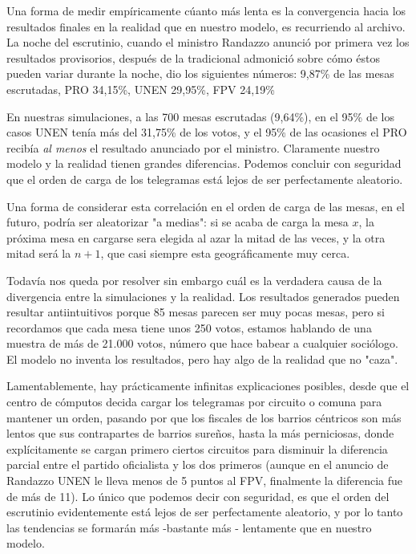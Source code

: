 \documentclass[12pt, a4paper]{article}
\begin{document}
Una forma de medir emp\'iricamente c\'uanto m\'as lenta es la convergencia hacia los resultados finales en la realidad que en nuestro modelo, es recurriendo al archivo. La noche del escrutinio, cuando el ministro Randazzo anunci\'o por primera vez los resultados provisorios, despu\'es de la tradicional admonici\'o sobre c\'omo \'estos pueden variar durante la noche, dio los siguientes n\'umeros: 9,87\% de las mesas escrutadas, PRO 34,15\%, UNEN 29,95\%, FPV 24,19\%

En nuestras simulaciones, a las 700 mesas escrutadas (9,64\%), en el 95\% de los casos UNEN ten\'ia m\'as del 31,75\% de los votos, y el 95\% de las ocasiones el PRO recib\'ia \emph{al menos} el resultado anunciado por el ministro. Claramente nuestro modelo y la realidad tienen grandes diferencias. Podemos concluir con seguridad que el orden de carga de los telegramas est\'a lejos de ser perfectamente aleatorio.

Una forma de considerar esta correlaci\'on en el orden de carga de las mesas, en el futuro, podr\'ia ser aleatorizar "a medias": si se acaba de carga la mesa $x$, la pr\'oxima mesa en cargarse sera elegida al azar la mitad de las veces, y la otra mitad ser\'a la $n+1$, que casi siempre esta geogr\'aficamente muy cerca.

Todav\'ia nos queda por resolver sin embargo cu\'al es la verdadera causa de la divergencia entre la simulaciones y la realidad. Los resultados generados pueden resultar antiintuitivos porque 85 mesas parecen ser muy pocas mesas, pero si recordamos que cada mesa tiene unos 250 votos, estamos hablando de una muestra de m\'as de 21.000 votos, n\'umero que hace babear a cualquier soci\'ologo. El modelo no inventa los resultados, pero hay algo de la realidad que no "caza". 

Lamentablemente, hay pr\'acticamente infinitas explicaciones posibles, desde que el centro de c\'omputos decida cargar los telegramas por circuito o comuna para mantener un orden, pasando por que los fiscales de los barrios c\'entricos son m\'as lentos que sus contrapartes de barrios sure\~nos, hasta la m\'as perniciosas, donde expl\'icitamente se cargan primero ciertos circuitos para disminuir la diferencia parcial entre el partido oficialista y los dos primeros (aunque en el anuncio de Randazzo UNEN le lleva menos de 5 puntos al FPV, finalmente la diferencia fue de m\'as de 11). Lo \'unico que podemos decir con seguridad, es que el orden del escrutinio evidentemente est\'a lejos de ser perfectamente aleatorio, y por lo tanto las tendencias se formar\'an m\'as -bastante m\'as - lentamente que en nuestro modelo.
\end{document}
